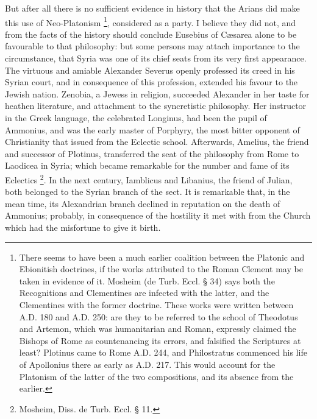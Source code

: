 But after all there is no sufficient evidence in history that the
Arians did make this use of Neo-Platonism \footnote{There seems to have been a much earlier
coalition between the Platonic and Ebionitish doctrines, if the works
attributed to the Roman Clement may be taken in evidence of it.
Mosheim (de Turb. Eccl. § 34) says both the Recognitions and
Clementines are infected with the latter, and the Clementines with the
former doctrine. These works were written between A.D.
180 and A.D. 250: are they to be referred to the
school of Theodotus and Artemon, which was humanitarian and Roman,
expressly claimed the Bishops of Rome as countenancing its errors, and
falsified the Scriptures at least? Plotinus came to Rome A.D.
244, and Philostratus commenced his life of Apollonius there as early
as A.D. 217. This would account for the
Platonism of the latter of the two compositions, and its absence from
the earlier.}, considered as a party. I believe they did not, and from
the facts of the history should conclude Eusebius of Cæsarea alone to
be favourable to that philosophy: but some persons may attach
importance to the circumstance, that Syria was one of its chief seats
from its very first appearance. The virtuous and amiable Alexander
Severus openly professed its creed in his Syrian court, and in
consequence of this profession, extended his favour to the Jewish
nation. Zenobia, a Jewess in religion, succeeded Alexander in her
taste for heathen literature, and attachment to the syncretistic
philosophy. Her instructor in the Greek language, the celebrated
Longinus, had been the pupil of Ammonius, and was the early master of
Porphyry, the most bitter opponent of Christianity that issued from
the Eclectic school. Afterwards, Amelius, the friend and successor of
Plotinus, transferred the seat of the philosophy from Rome to Laodicea
in Syria; which became remarkable for the number and fame of its
Eclectics \footnote{Mosheim, Diss. de Turb. Eccl. § 11.}. In the next
century, Iamblicus and Libanius, the friend of Julian, both belonged
to the Syrian branch of the sect. It is remarkable that, in the mean
time, its Alexandrian branch declined in reputation on the death of
Ammonius; probably, in consequence of the hostility it met with from
the Church which had the misfortune to give it birth.


